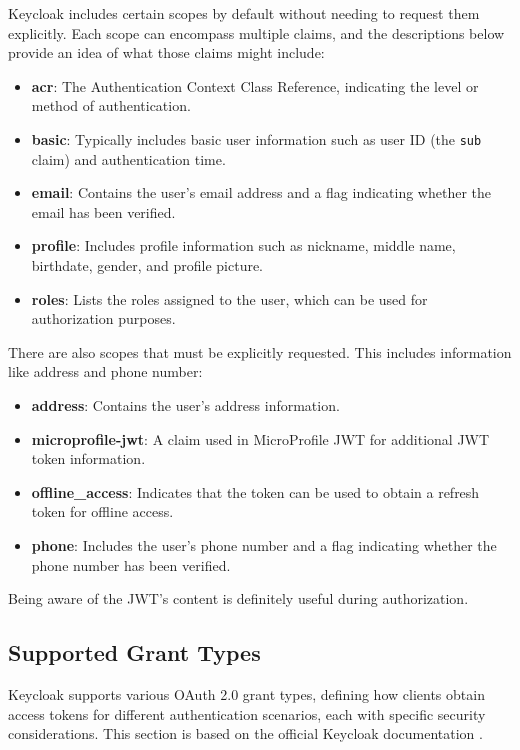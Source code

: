 Keycloak includes certain scopes by default without needing to request them explicitly. Each scope can encompass multiple claims, and the descriptions below provide an idea of what those claims might include:

\begin{itemize} 
    \item \textbf{acr}: The Authentication Context Class Reference, indicating the level or method of authentication. 
    \item \textbf{basic}: Typically includes basic user information such as user ID (the \texttt{sub} claim) and authentication time. 
    \item \textbf{email}: Contains the user's email address and a flag indicating whether the email has been verified. 
    \item 
    \textbf{profile}: Includes profile information such as nickname, middle name, birthdate, gender, and profile picture. 
    \item \textbf{roles}: Lists the roles assigned to the user, which can be used for authorization purposes. 
\end{itemize}

There are also scopes that must be explicitly requested. This includes information like address and phone number:

\begin{itemize} 
    \item \textbf{address}: Contains the user's address information. 
    \item \textbf{microprofile-jwt}: A claim used in MicroProfile JWT for additional JWT token information. 
    \item \textbf{offline\_access}: Indicates that the token can be used to obtain a refresh token for offline access. 
    \item \textbf{phone}: Includes the user's phone number and a flag indicating whether the phone number has been verified. 
\end{itemize}

Being aware of the JWT's content is definitely useful during authorization.

\subsection{Supported Grant Types}
Keycloak supports various OAuth 2.0 grant types, defining how clients obtain access tokens for different authentication scenarios, each with specific security considerations. This section is based on the official Keycloak documentation \cite{keycloakGrantTypes}.

